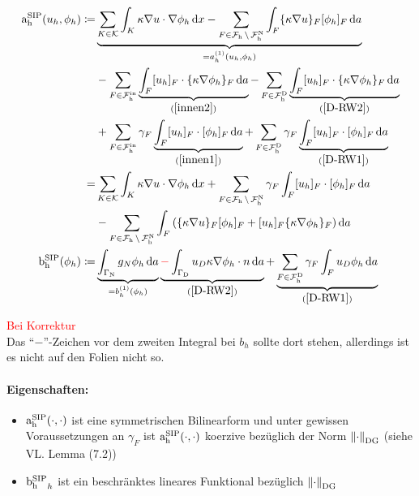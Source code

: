 \begin{define}
	\begin{align*}
		\asip(u_h, \phi_h) \coloneqq &\underbrace{\sum_{K \in \mathcal{K}} \int_K \kappa \nabla u \cdot \nabla \phi_h \diff x - \sum_{F \in \F\setminus\FN } \int_{F} \{\kappa \nabla u \}_F [\phi_h]_F \diff a}_{= a_h^{(1)}(u_h, \phi_h)}\\
		&- \sum_{F \in \FIn} \underbrace{\int_F [u_h]_F \cdot \{ \kappa \nabla \phi_h \}_F \diff a}_{(\ref{innen2})} - \sum_{F \in \FD} \underbrace{\int_F [u_h]_F \cdot \{ \kappa \nabla \phi_h \}_F \diff a}_{(\ref{D-RW2})}\\
		&+\sum_{F \in \FIn} \gamma_F \underbrace{\int_F [u_h]_F \cdot [\phi_h]_F \diff a}_{(\ref{innen1})} + \sum_{F \in \FD} \gamma_F \underbrace{\int_F [u_h]_F \cdot [\phi_h]_F \diff a}_{(\ref{D-RW1})}\\
		=& \sum_{K \in \mathcal{K}} \int_K \kappa \nabla u \cdot \nabla \phi_h \diff x + \sum_{F \in \F\setminus\FN}  \gamma_F \int_F [u_h]_F \cdot [\phi_h]_F \diff a\\
		&- \sum_{F \in \F\setminus\FN} \int_F \left(  \{\kappa \nabla u \}_F [\phi_h]_F + [u_h]_F \{\kappa \nabla \phi_h \}_F  \right) \diff a\\
		\bsip(\phi_h) \coloneqq & \underbrace{\int_{\GammaN} g_N \phi_h \diff a}_{=b_h^{(1)}(\phi_h)} \underbrace{\textcolor{red}{-} \int_{\GammaD} u_D \kappa \nabla \phi_h \cdot n \diff a}_{(\ref{D-RW2})} + \underbrace{\sum_{F \in \FD} \gamma_F \int_F u_D \phi_h \diff a}_{(\ref{D-RW1})}
	\end{align*}
\end{define}
\begin{remark}\textcolor{red}{Bei Korrektur}\\
	Das \enquote{$-$}-Zeichen vor dem zweiten Integral bei $ b_h $ sollte dort stehen, allerdings ist es nicht auf den Folien nicht so.
\end{remark}

\paragraph{Eigenschaften:}
\begin{itemize}
	\item $ \operatorname{a_h^{\text{SIP}}}(\cdot,\cdot) $ ist eine symmetrischen Bilinearform und unter gewissen Voraussetzungen an $ \gamma_F $ ist $ \operatorname{a_h^{\text{SIP}}}(\cdot,\cdot) $ koerzive bezüglich der Norm $ \norm{\cdot}_{\text{DG}} $ (siehe VL. Lemma (7.2))
	\item $ \operatorname{b_h^{\text{SIP}}}_h $ ist ein beschränktes lineares Funktional bezüglich $ \norm{\cdot}_{\text{DG}} $ 
\end{itemize}

